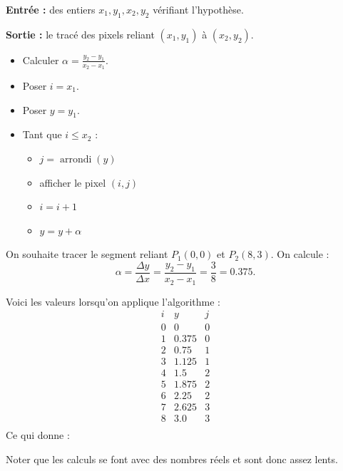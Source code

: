 \documentclass[11pt,class=report,crop=false]{standalone}
\begin{document}

\begin{algorithme}

\textbf{Entrée :} des entiers $x_1, y_1, x_2, y_2$ vérifiant l'hypothèse.

\textbf{Sortie :} le tracé des pixels reliant $(x_1,y_1)$ à $(x_2,y_2)$.

\begin{itemize}
	\item Calculer $\alpha =  \frac{y_2-y_1}{x_2-x_1}$.
	\item Poser $i = x_1$.
	\item Poser $y = y_1$.
	
	\item Tant que $i \le x_2$ :
	\begin{itemize}
		\item $j = \operatorname{arrondi}(y)$
		\item afficher le pixel $(i,j)$
		\item $i = i + 1$
		\item $y = y + \alpha$
	\end{itemize}
\end{itemize}
\end{algorithme}

\begin{exemple}	
On souhaite tracer le segment reliant $P_1(0,0)$ et $P_2(8,3)$.
On calcule :
$$\alpha =\frac{\Delta y}{\Delta x} = \frac{y_2-y_1}{x_2-x_1} = \frac38 = 0.375.$$

Voici les valeurs lorsqu'on applique l'algorithme :
$$\begin{array}{ccc}
i & y 		& j \\ \hline	
0 & 0       & 0 \\
1 & 0.375   & 0 \\
2 & 0.75    & 1 \\
3 & 1.125   & 1 \\
4 & 1.5     & 2 \\
5 & 1.875   & 2 \\
6 & 2.25    & 2 \\
7 & 2.625   & 3 \\
8 & 3.0     & 3 \\
\end{array}
$$
Ce qui donne :
\end{exemple}

Noter que les calculs se font avec des nombres réels et sont donc assez lents.
\end{document}
